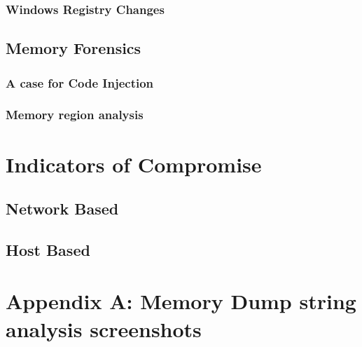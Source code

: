 \documentclass[10pt,a4paper]{article}
\begin{document}
				\subsubsection{Windows Registry Changes}
		\subsection{Memory Forensics}
				\subsubsection{A case for Code Injection}
				\subsubsection{Memory region analysis}

\section{Indicators of Compromise}
			\subsection{Network Based}
			\subsection{Host Based}

\newpage
\section{Appendix A: Memory Dump string analysis screenshots}

\newpage
\printbibliography
\end{document}
